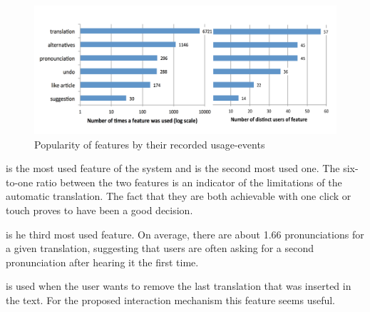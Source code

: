   \begin{figure}[h!]
  \centering
    \includegraphics[width=1.0\columnwidth]{figures/feature-usage}
    \caption{Popularity of features by their recorded usage-events}
    \label{fig:feature_usage}
  \end{figure}

 is the most used feature of the system and  is the second most used one. The six-to-one ratio between the two features is an indicator of the limitations of the automatic translation. The fact that they are both achievable with one click or touch proves to have been a good decision. 

 is he third most used feature. On average, there are about 1.66 pronunciations for a given translation, suggesting that users are often asking for a second pronunciation after hearing it the first time. 




 is used when the user wants to remove the last translation that was inserted in the text. For the proposed interaction mechanism this feature seems useful. 

